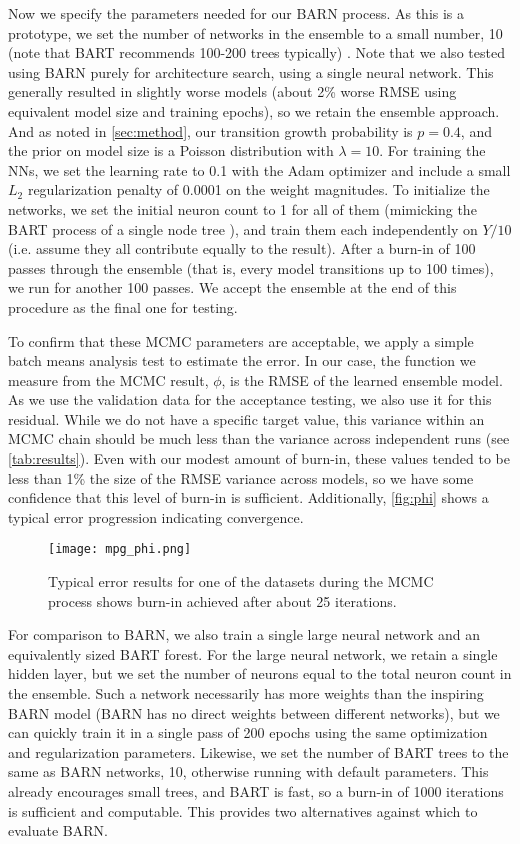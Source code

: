 \documentclass[12pt]{article}
\begin{document}
Now we specify the parameters needed for our BARN process.  As this is a prototype, we set the number of networks in the ensemble to a small number, 10 (note that BART recommends 100-200 trees typically) \cite{chipman2010bart}.  Note that we also tested using BARN purely for architecture search, using a single neural network.  This generally resulted in slightly worse models (about 2\% worse RMSE using equivalent model size and training epochs), so we retain the ensemble approach.  And as noted in \autoref{sec:method}, our transition growth probability is $p=0.4$, and the prior on model size is a Poisson distribution with $\lambda=10$.  For training the NNs, we set the learning rate to 0.1 with the Adam optimizer and include a small $L_2$ regularization penalty of 0.0001 on the weight magnitudes.  To initialize the networks, we set the initial neuron count to 1 for all of them (mimicking the BART process of a single node tree \cite{chipman2010bart}), and train them each independently on $Y/10$ (i.e. assume they all contribute equally to the result).  After a burn-in of 100 passes through the ensemble (that is, every model transitions up to 100 times), we run for another 100 passes.  We accept the ensemble at the end of this procedure as the final one for testing.

To confirm that these MCMC parameters are acceptable, we apply a simple batch means analysis test to estimate the error.  In our case, the function we measure from the MCMC result, $\phi$, is the RMSE of the learned ensemble model.  As we use the validation data for the acceptance testing, we also use it for this residual.  While we do not have a specific target value, this variance within an MCMC chain should be much less than the variance across independent runs (see \autoref{tab:results}).  Even with our modest amount of burn-in, these values tended to be less than 1\% the size of the RMSE variance across models, so we have some confidence that this level of burn-in is sufficient.  Additionally, \autoref{fig:phi} shows a typical error progression indicating convergence.

\begin{figure}[ht]
\centering
    \texttt{[image: mpg\_phi.png]}
    \caption{Typical error results for one of the datasets during the MCMC process shows burn-in achieved after about 25 iterations.}
    \label{fig:phi}
\end{figure}

For comparison to BARN, we also train a single large neural network and an equivalently sized BART forest.  For the large neural network, we retain a single hidden layer, but we set the number of neurons equal to the total neuron count in the ensemble.  Such a network necessarily has more weights than the inspiring BARN model (BARN has no direct weights between different networks), but we can quickly train it in a single pass of 200 epochs using the same optimization and regularization parameters.  Likewise, we set the number of BART trees to the same as BARN networks, 10, otherwise running with default parameters.  This already encourages small trees, and BART is fast, so a burn-in of 1000 iterations is sufficient and computable.  This provides two alternatives against which to evaluate BARN.
\end{document}
